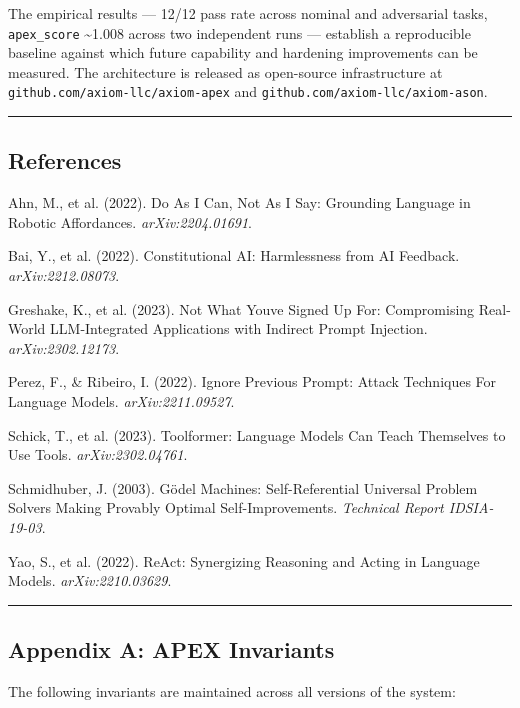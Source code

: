 \documentclass[
]{article}
\begin{document}
The empirical results --- 12/12 pass rate across nominal and adversarial
tasks, \texttt{apex\_score} \textasciitilde1.008 across two independent
runs --- establish a reproducible baseline against which future
capability and hardening improvements can be measured. The architecture
is released as open-source infrastructure at
\texttt{github.com/axiom-llc/axiom-apex} and
\texttt{github.com/axiom-llc/axiom-ason}.

\begin{center}\rule{0.5\linewidth}{0.5pt}\end{center}

\subsection{References}\label{references}

Ahn, M., et al. (2022). Do As I Can, Not As I Say: Grounding Language in
Robotic Affordances. \emph{arXiv:2204.01691}.

Bai, Y., et al. (2022). Constitutional AI: Harmlessness from AI
Feedback. \emph{arXiv:2212.08073}.

Greshake, K., et al. (2023). Not What You\textquotesingle ve Signed Up
For: Compromising Real-World LLM-Integrated Applications with Indirect
Prompt Injection. \emph{arXiv:2302.12173}.

Perez, F., \& Ribeiro, I. (2022). Ignore Previous Prompt: Attack
Techniques For Language Models. \emph{arXiv:2211.09527}.

Schick, T., et al. (2023). Toolformer: Language Models Can Teach
Themselves to Use Tools. \emph{arXiv:2302.04761}.

Schmidhuber, J. (2003). Gödel Machines: Self-Referential Universal
Problem Solvers Making Provably Optimal Self-Improvements.
\emph{Technical Report IDSIA-19-03}.

Yao, S., et al. (2022). ReAct: Synergizing Reasoning and Acting in
Language Models. \emph{arXiv:2210.03629}.

\begin{center}\rule{0.5\linewidth}{0.5pt}\end{center}

\subsection{Appendix A: APEX
Invariants}\label{appendix-a-apex-invariants}

The following invariants are maintained across all versions of the
system:
\end{document}
